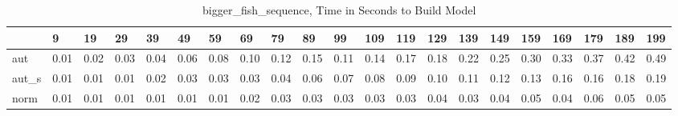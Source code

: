 \begin{table}
\caption{bigger_fish_sequence, Time in Seconds to Build Model}
\label{bigger_fish_sequence_model_time}
\begin{tabular}{lllllllllllllllllllll}
\toprule
 & 9 & 19 & 29 & 39 & 49 & 59 & 69 & 79 & 89 & 99 & 109 & 119 & 129 & 139 & 149 & 159 & 169 & 179 & 189 & 199 \\
\midrule
aut & 0.01 & 0.02 & 0.03 & 0.04 & 0.06 & 0.08 & 0.10 & 0.12 & 0.15 & 0.11 & 0.14 & 0.17 & 0.18 & 0.22 & 0.25 & 0.30 & 0.33 & 0.37 & 0.42 & 0.49 \\
aut_s & 0.01 & 0.01 & 0.01 & 0.02 & 0.03 & 0.03 & 0.03 & 0.04 & 0.06 & 0.07 & 0.08 & 0.09 & 0.10 & 0.11 & 0.12 & 0.13 & 0.16 & 0.16 & 0.18 & 0.19 \\
norm & 0.01 & 0.01 & 0.01 & 0.01 & 0.01 & 0.01 & 0.02 & 0.03 & 0.03 & 0.03 & 0.03 & 0.03 & 0.04 & 0.03 & 0.04 & 0.05 & 0.04 & 0.06 & 0.05 & 0.05 \\
\bottomrule
\end{tabular}
\end{table}
